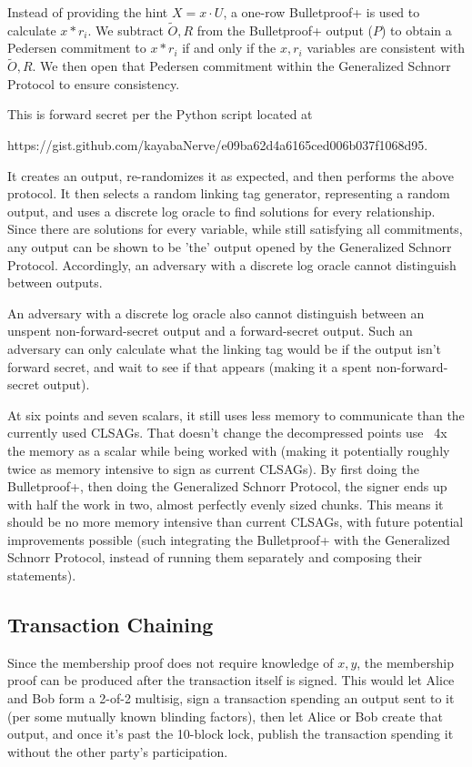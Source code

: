 \documentclass[]{article}
\begin{document}
Instead of providing the hint $X = x \cdot U$, a one-row Bulletproof+ is used to calculate $x * r_i$. We subtract $\tilde{O}, R$ from the Bulletproof+ output ($P$) to obtain a Pedersen commitment to $x * r_i$ if and only if the $x, r_i$ variables are consistent with $\tilde{O}, R$. We then open that Pedersen commitment within the Generalized Schnorr Protocol to ensure consistency.

This is forward secret per the Python script located at

https://gist.github.com/kayabaNerve/e09ba62d4a6165ced006b037f1068d95.

It creates an output, re-randomizes it as expected, and then performs the above protocol. It then selects a random linking tag generator, representing a random output, and uses a discrete log oracle to find solutions for every relationship. Since there are solutions for every variable, while still satisfying all commitments, any output can be shown to be 'the' output opened by the Generalized Schnorr Protocol. Accordingly, an adversary with a discrete log oracle cannot distinguish between outputs.

An adversary with a discrete log oracle also cannot distinguish between an unspent non-forward-secret output and a forward-secret output. Such an adversary can only calculate what the linking tag would be if the output isn't forward secret, and wait to see if that appears (making it a spent non-forward-secret output).

At six points and seven scalars, it still uses less memory to communicate than the currently used CLSAGs. That doesn't change the decompressed points use ~4x the memory as a scalar while being worked with (making it potentially roughly twice as memory intensive to sign as current CLSAGs). By first doing the Bulletproof+, then doing the Generalized Schnorr Protocol, the signer ends up with half the work in two, almost perfectly evenly sized chunks. This means it should be no more memory intensive than current CLSAGs, with future potential improvements possible (such integrating the Bulletproof+ with the Generalized Schnorr Protocol, instead of running them separately and composing their statements).

\subsection{Transaction Chaining}

Since the membership proof does not require knowledge of $x, y$, the membership proof can be produced after the transaction itself is signed. This would let Alice and Bob form a 2-of-2 multisig, sign a transaction spending an output sent to it (per some mutually known blinding factors), then let Alice or Bob create that output, and once it's past the 10-block lock, publish the transaction spending it without the other party's participation.
\end{document}
